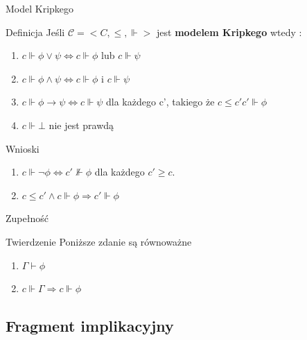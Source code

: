 \documentclass{beamer}
\begin{document}
\begin{frame}{Model Kripkego}
 \begin{block}{Definicja}
Jeśli \( \mathcal{C} = < C, \leq, \Vdash> \) jest \textbf{modelem Kripkego} wtedy : 
\begin{enumerate}
	\item \(c \Vdash \phi \vee \psi \Leftrightarrow c \Vdash  \phi \) lub \( c \Vdash \psi \) 
 \item \(c \Vdash \phi \wedge \psi \Leftrightarrow c \Vdash  \phi \) i \( c \Vdash \psi \) 
 \item \(c \Vdash \phi \rightarrow \psi \Leftrightarrow c \Vdash  \psi \) dla każdego c', takiego że \( c \leq c'  c' \Vdash \phi \) 
 \item \( c \Vdash \bot \) nie jest prawdą
 
\end{enumerate}
 \end{block}
 
  \begin{block}{Wnioski}

\begin{enumerate}

 \item \(c \Vdash \neg \phi \Leftrightarrow  c'\nVdash \phi\) dla każdego \( c' \geq c\).

 \item \(c \leq c' \wedge  c \Vdash \phi \Rightarrow c' \Vdash \phi \)
\end{enumerate}
 \end{block}
\end{frame}


\begin{frame}{Zupełność}
 \begin{block}{Twierdzenie}
Poniższe zdanie są równoważne
\begin{enumerate}
\item \( \Gamma \vdash \phi \)
\item \( c \Vdash \Gamma \Rightarrow c \Vdash \phi \)
\end{enumerate}
 \end{block}
 
\end{frame}

\subsection{Fragment implikacyjny}
\end{document}

